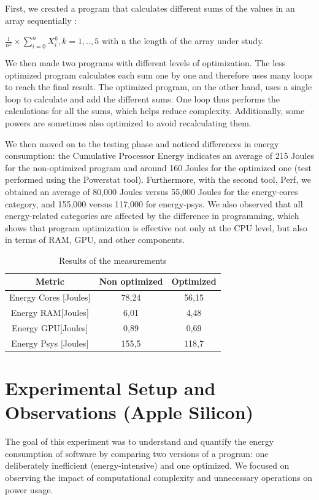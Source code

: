 \documentclass[twocolumn,10pt]{article}
\begin{document}
First, we created a program that calculates different sums of the values in an array sequentially : 

$\frac{1}{n^k}\times \sum_{i=0}^n X_i^k, k=1,..,5$ with n the length of the array under study.

We then made two programs with different levels of optimization.
The less optimized program calculates each sum one by one and therefore uses many loops to reach the final result.
The optimized program, on the other hand, uses a single loop to calculate and add the different sums.
One loop thus performs the calculations for all the sums, which helps reduce complexity.
Additionally, some powers are sometimes also optimized to avoid recalculating them.

We then moved on to the testing phase and noticed differences in energy consumption: the Cumulative Processor Energy indicates an average of 215 Joules for the non-optimized program and around 160 Joules for the optimized one (test performed using the Powerstat tool).
Furthermore, with the second tool, Perf, we obtained an average of 80,000 Joules versus 55,000 Joules for the energy-cores category, and 155,000 versus 117,000 for energy-psys.
We also observed that all energy-related categories are affected by the difference in programming, which shows that program optimization is effective not only at the CPU level, but also in terms of RAM, GPU, and other components.

\begin{table}[]
    \centering
    \begin{tabular}{|c|c|c|}
         \hline Metric & Non optimized & Optimized \\ \hline
         Energy Cores [Joules] & 78,24 & 56,15 \\
         Energy RAM[Joules] & 6,01 & 4,48 \\
         Energy GPU[Joules] & 0,89 & 0,69 \\
         Energy Psys [Joules] & 155,5 & 118,7 \\ \hline
    \end{tabular}
    \caption{Results of the measurements}
    \label{tab:results}
\end{table}


\section{Experimental Setup and Observations (Apple Silicon)}

The goal of this experiment was to understand and quantify the energy consumption of software by comparing two versions of a program: one deliberately inefficient (energy-intensive) and one optimized. 
We focused on observing the impact of computational complexity and unnecessary operations on power usage.
\end{document}
